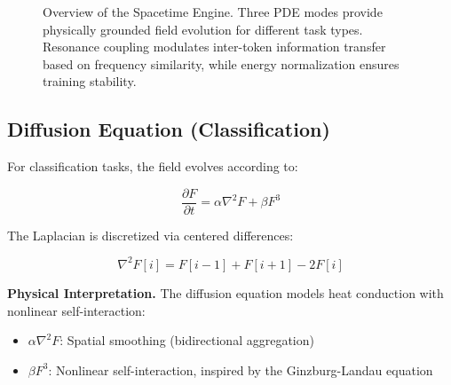 \documentclass{article}
\begin{document}
\begin{figure}[t]
\caption{Overview of the Spacetime Engine. Three PDE modes provide physically grounded field evolution for different task types. Resonance coupling modulates inter-token information transfer based on frequency similarity, while energy normalization ensures training stability.}
\label{fig:engine-overview}
\end{figure}

\subsection{Diffusion Equation (Classification)}

For classification tasks, the field evolves according to:

\begin{equation}
\frac{\partial F}{\partial t} = \alpha \nabla^2 F + \beta F^3
\end{equation}

The Laplacian is discretized via centered differences:

\begin{equation}
\nabla^2 F[i] = F[i-1] + F[i+1] - 2F[i]
\end{equation}

\textbf{Physical Interpretation.} The diffusion equation models heat conduction with nonlinear self-interaction:
\begin{itemize}
\item $\alpha \nabla^2 F$: Spatial smoothing (bidirectional aggregation)
\item $\beta F^3$: Nonlinear self-interaction, inspired by the Ginzburg-Landau equation~\citep{ginzburg1950k}
\end{itemize}
\end{document}
